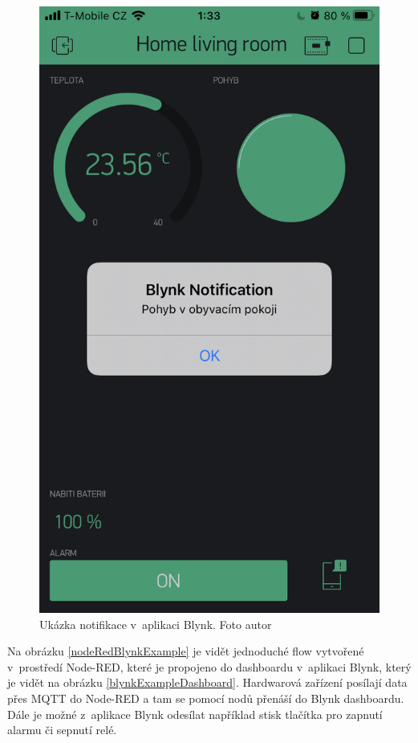 \begin{figure}[H]
\begin{minipage}[b]{0.3\textwidth}
    \includegraphics[width=\textwidth]{obrazky-figures/blynk/movementWithTMP112Blynk.png}
    \caption{Ukázka notifikace v~aplikaci Blynk. Foto autor}
    \label{notificationShowcaseBlynk}
  \end{minipage}
\end{figure}

Na obrázku \ref{nodeRedBlynkExample} je vidět jednoduché flow vytvořené v~prostředí Node-RED, které je propojeno do dashboardu v~aplikaci Blynk, který je vidět na obrázku \ref{blynkExampleDashboard}. Hardwarová zařízení posílají data přes MQTT do Node-RED a tam se pomocí nodů přenáší do Blynk dashboardu. Dále je možné z~aplikace Blynk odesílat například stisk tlačítka pro zapnutí alarmu či sepnutí relé.

